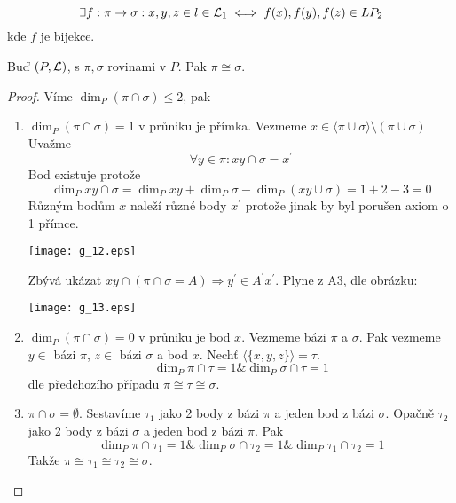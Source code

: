 \begin{definition}
	\[ \exists f: \pi \to \sigma: x, y, z \in l \in \operatorname{\mathcal{L}}_1 \iff f(x), f(y), f(z) \in LP_2 \]
	kde $f$ je bijekce.
\end{definition}

\begin{theorem}
    Buď $(P,\operatorname{\mathcal{L}})$, s $\pi,\sigma$ rovinami v $P$.
    Pak $\pi\cong\sigma$.
\end{theorem}
\begin{proof}
	Víme $\dim_P(\pi \cap \sigma) \leq 2$, pak
    \begin{enumerate}
        \item $\dim_P(\pi \cap \sigma) = 1$ v průniku je přímka.
		Vezmeme $x \in \langle \pi \cup \sigma \rangle \setminus (\pi \cup \sigma)$
		Uvažme
		\[ \forall y \in \pi: xy \cap \sigma = x^{\prime} \]
		Bod existuje protože
		\[ \dim_P xy \cap \sigma = \dim_P xy + \dim_P \sigma - \dim_P(xy \cup \sigma) = 1 + 2 - 3 = 0 \]
		Různým bodům $x$ naleží různé body $x^{\prime}$ protože jinak by byl porušen axiom o 1 přímce.

    	\texttt{[image: g\_12.eps]}

	Zbývá ukázat $xy \cap (\pi \cap \sigma = A) \Rightarrow y^{\prime} \in A^{\prime}x^{\prime}$.
	Plyne z A3, dle obrázku:

    	\texttt{[image: g\_13.eps]}

        \item $\dim_P(\pi \cap \sigma) = 0$ v průniku je bod $x$.
		Vezmeme bázi $\pi$ a $\sigma$.
		Pak vezmeme $y \in$ bázi $\pi$, $z \in$ bázi $\sigma$ a bod $x$.
		Nechť $\langle \{ x, y, z \} \rangle = \tau$.
		\[ \dim_P \pi \cap \tau = 1 \& \dim_P \sigma \cap \tau = 1 \]
		dle předchozího případu $\pi \cong \tau \cong \sigma$.
	\item $\pi \cap \sigma = \emptyset$.
		Sestavíme $\tau_1$ jako 2 body z bázi $\pi$ a jeden bod z bázi $\sigma$.
		Opačně $\tau_2$ jako 2 body z bázi $\sigma$ a jeden bod z bázi $\pi$.
		Pak
		\[ \dim_P \pi \cap \tau_1 = 1 \& \dim_P \sigma \cap \tau_2 = 1 \& \dim_P \tau_1 \cap \tau_2 = 1 \]
		Takže $\pi \cong \tau_1 \cong \tau_2 \cong \sigma$.
    \end{enumerate}
\end{proof}

